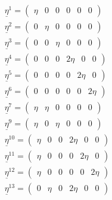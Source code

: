 \documentclass[showpacs,aps,floatfix,prb,reprint,superscriptaddress,onecolumn]{revtex4-1}
\begin{document}
\begin{enumerate}
 \begin{widetext}
\begin{subequations}
\label{eqn:strainstates} 
\begin{align}
        \underline{\eta}^1 =\left(\begin{matrix} \eta & 0 & 0 & 0 & 0 & 0 \end{matrix}\right)\\
		\underline{\eta}^2 =\left(\begin{matrix} 0 & \eta & 0 & 0 & 0 & 0 \end{matrix}\right)\\
		\underline{\eta}^3 =\left(\begin{matrix} 0 & 0 & \eta & 0 & 0 & 0 \end{matrix}\right)\\
    	\underline{\eta}^4 =\left(\begin{matrix} 0 & 0 & 0 & 2\eta & 0 & 0 \end{matrix}\right)\\
    	\underline{\eta}^5 =\left(\begin{matrix} 0 & 0 & 0 & 0 & 2\eta & 0 \end{matrix}\right)\\
    	\underline{\eta}^6 =\left(\begin{matrix} 0 & 0 & 0 & 0 & 0 & 2\eta \end{matrix}\right)\\
    	\underline{\eta}^7 =\left(\begin{matrix} \eta & \eta & 0 & 0 & 0 & 0 \end{matrix}\right)\\
    	\underline{\eta}^9 =\left(\begin{matrix} \eta & 0 & \eta & 0 & 0 & 0 \end{matrix}\right)\\
    	\underline{\eta}^{10} =\left(\begin{matrix} \eta & 0 & 0 & 2\eta & 0 & 0 \end{matrix}\right)\\
    	\underline{\eta}^{11} =\left(\begin{matrix} \eta & 0 & 0 & 0 & 2\eta & 0 \end{matrix}\right)\\
    	\underline{\eta}^{12} =\left(\begin{matrix} \eta & 0 & 0 & 0 & 0 & 2\eta \end{matrix}\right)\\
    	\underline{\eta}^{13} =\left(\begin{matrix} 0 & \eta & 0 & 2\eta & 0 & 0 \end{matrix}\right)\\

\end{align}
\end{subequations}
\end{widetext}
\end{enumerate}
\end{document}
